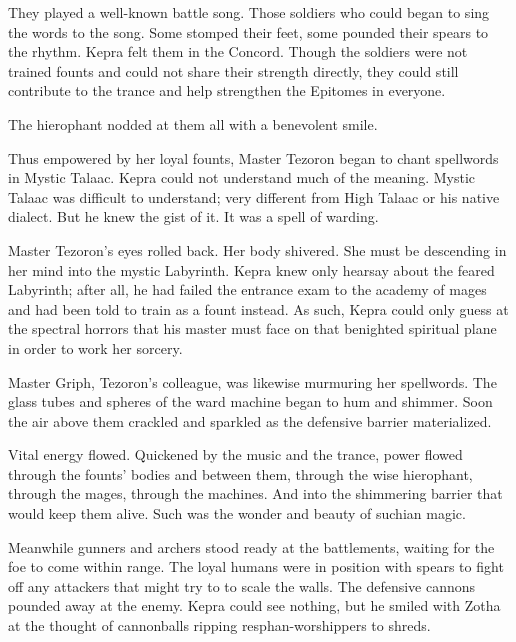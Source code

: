 \documentclass
  [a4paper,
   12pt,
   oneside
  ]%
  {article}
\begin{document}
They played a well-known battle song. 
Those soldiers who could began to sing the words to the song. Some stomped their feet, some pounded their spears to the rhythm. Kepra felt them in the Concord. Though the soldiers were not trained founts and could not share their strength directly, they could still contribute to the trance and help strengthen the Epitomes in everyone.

The hierophant nodded at them all with a benevolent smile.

Thus empowered by her loyal founts, Master Tezoron began to chant spellwords in Mystic Talaac. 
Kepra could not understand much of the meaning. Mystic Talaac was difficult to understand; very different from High Talaac or his native dialect.
But he knew the gist of it. It was a spell of warding. 

Master Tezoron’s eyes rolled back. Her body shivered. She must be descending in her mind into the mystic Labyrinth. Kepra knew only hearsay about the feared Labyrinth; after all, he had failed the entrance exam to the academy of mages and had been told to train as a fount instead. 
As such, Kepra could only guess at the spectral horrors that his master must face on that benighted spiritual plane in order to work her sorcery. 

Master Griph, Tezoron's colleague, was likewise murmuring her spellwords. 
The glass tubes and spheres of the ward machine began to hum and shimmer. Soon the air above them crackled and sparkled as the defensive barrier materialized.

Vital energy flowed. 
Quickened by the music and the trance, power flowed through the founts' bodies and between them, through the wise hierophant, through the mages, through the machines. And into the shimmering barrier that would keep them alive. 
Such was the wonder and beauty of suchian magic.

Meanwhile gunners and archers stood ready at the battlements, waiting for the foe to come within range. 
The loyal humans were in position with spears to fight off any attackers that might try to to scale the walls. 
The defensive cannons pounded away at the enemy. Kepra could see nothing, but he smiled with Zotha at the thought of cannonballs ripping resphan-worshippers to shreds.

\end{document}
